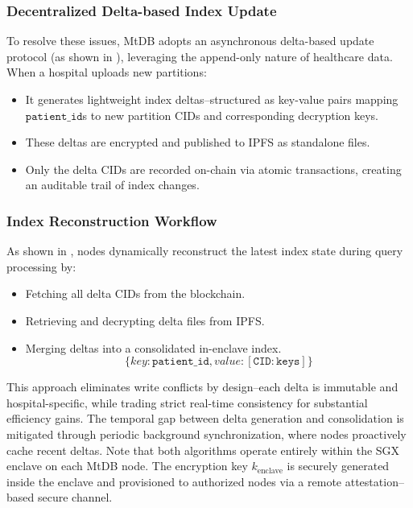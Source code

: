 \documentclass[conference]{IEEEtran}
\newcommand{\ours}{\xspace MtDB\xspace}
\begin{document}
\subsubsection{Decentralized Delta-based Index Update}
To resolve these issues, \ours adopts an asynchronous delta-based update protocol (as shown in ), leveraging the append-only nature of healthcare data. When a hospital uploads new partitions:
\begin{itemize}
    \item It generates lightweight index deltas--structured as key-value pairs mapping $\texttt{patient\_id}$s to new partition CIDs and corresponding decryption keys.
    \item These deltas are encrypted and published to IPFS as standalone files.
    \item Only the delta CIDs are recorded on-chain via atomic transactions, creating an auditable trail of index changes.
\end{itemize}

\subsubsection{Index Reconstruction Workflow}

As shown in   , nodes dynamically reconstruct the latest index state during query processing by:
\begin{itemize}
    \item Fetching all delta CIDs from the blockchain.
    \item Retrieving and decrypting delta files from IPFS.
    \item Merging deltas into a consolidated in-enclave index. \[\{key: \texttt{patient\_id}, value:[\mathtt{CID:keys}]\}\]
\end{itemize}

This approach eliminates write conflicts by design--each delta is immutable and hospital-specific, while trading strict real-time consistency for substantial efficiency gains. The temporal gap between delta generation and consolidation is mitigated through periodic background synchronization, where nodes proactively cache recent deltas. Note that both algorithms operate entirely within the SGX enclave on each \ours node. The encryption key $k_{\text{enclave}}$ is securely generated inside the enclave and provisioned to authorized nodes via a remote attestation–based secure channel.
\end{document}
